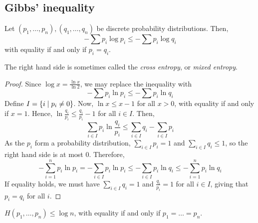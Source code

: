 \subsection{Gibbs' inequality}
\begin{proposition}
    Let \( (p_1, \dots, p_n), (q_1, \dots, q_n) \) be discrete probability distributions.
    Then,
    \[ -\sum p_i \log p_i \leq -\sum p_i \log q_i \]
    with equality if and only if \( p_i = q_i \).
\end{proposition}
The right hand side is sometimes called the \emph{cross entropy}, or \emph{mixed entropy}.
\begin{proof}
    Since \( \log x = \frac{\ln x}{\ln 2} \), we may replace the inequality with
    \[ -\sum p_i \ln p_i \leq -\sum p_i \ln q_i \]
    Define \( I = \qty{i \mid p_i \neq 0} \).
    Now, \( \ln x \leq x - 1 \) for all \( x > 0 \), with equality if and only if \( x = 1 \).
    Hence, \( \ln \frac{q_i}{p_i} \leq \frac{q_i}{p_i} - 1 \) for all \( i \in I \).
    Then,
    \[ \sum_{i \in I} p_i \ln \frac{q_i}{p_i} \leq \sum_{i \in I} q_i - \sum_{i \in I} p_i \]
    As the \( p_i \) form a probability distribution, \( \sum_{i \in I} p_i = 1 \) and \( \sum_{i \in I} q_i \leq 1 \), so the right hand side is at most 0.
    Therefore,
    \[ -\sum_{i=1}^n p_i \ln p_i = -\sum_{i \in I} p_i \ln p_i \leq -\sum_{i \in I} p_i \ln q_i \leq -\sum_{i=1}^n p_i \ln q_i \]
    If equality holds, we must have \( \sum_{i \in I} q_i = 1 \) and \( \frac{q_i}{p_i} = 1 \) for all \( i \in I \), giving that \( p_i = q_i \) for all \( i \).
\end{proof}
\begin{corollary}
    \( H(p_1, \dots, p_n) \leq \log n \), with equality if and only if \( p_1 = \dots = p_n \).
\end{corollary}

